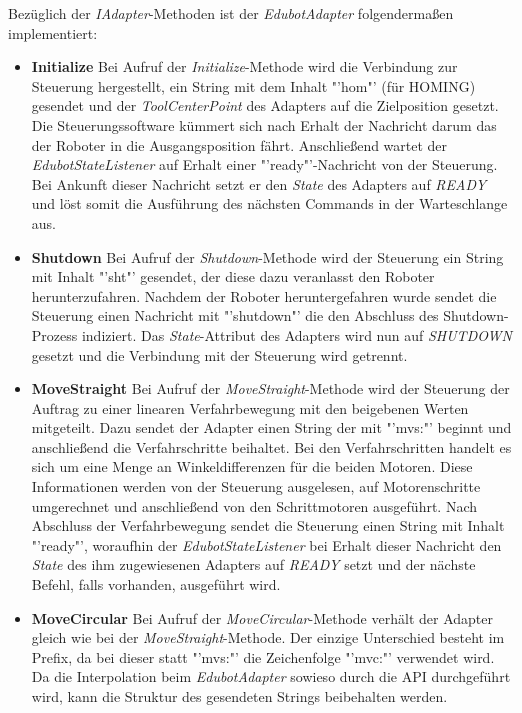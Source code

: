 Bezüglich der \textit{IAdapter}-Methoden ist der \textit{EdubotAdapter} folgendermaßen implementiert:
\begin{itemize}
\item \textbf{Initialize}
\newline
Bei Aufruf der \textit{Initialize}-Methode wird die Verbindung zur Steuerung hergestellt, ein String mit dem Inhalt "'hom"' (für HOMING) gesendet und der \textit{ToolCenterPoint} des Adapters auf die Zielposition gesetzt. Die Steuerungssoftware kümmert sich nach Erhalt der Nachricht darum das der Roboter in die Ausgangsposition fährt. Anschließend wartet der \textit{EdubotStateListener} auf Erhalt einer "'ready"'-Nachricht von der Steuerung. Bei Ankunft dieser Nachricht setzt er den \textit{State} des Adapters auf \textit{READY} und löst somit die Ausführung des nächsten Commands in der Warteschlange aus.
\item \textbf{Shutdown}
\newline
Bei Aufruf der \textit{Shutdown}-Methode wird der Steuerung ein String mit Inhalt "'sht"' gesendet, der diese dazu veranlasst den Roboter herunterzufahren. Nachdem der Roboter heruntergefahren wurde sendet die Steuerung einen Nachricht mit "'shutdown"' die den Abschluss des Shutdown-Prozess indiziert. Das \textit{State}-Attribut des Adapters wird nun auf \textit{SHUTDOWN} gesetzt und die Verbindung mit der Steuerung wird getrennt.
\item \textbf{MoveStraight}
\newline
Bei Aufruf der \textit{MoveStraight}-Methode wird der Steuerung der Auftrag zu einer linearen Verfahrbewegung mit den beigebenen Werten mitgeteilt. Dazu sendet der Adapter einen String der mit "'mvs:"' beginnt und anschließend die Verfahrschritte beihaltet. Bei den Verfahrschritten handelt es sich um eine Menge an Winkeldifferenzen für die beiden Motoren. Diese Informationen werden von der Steuerung ausgelesen, auf Motorenschritte umgerechnet und anschließend von den Schrittmotoren ausgeführt. Nach Abschluss der Verfahrbewegung sendet die Steuerung einen String mit Inhalt "'ready"', woraufhin der \textit{EdubotStateListener} bei Erhalt dieser Nachricht den \textit{State} des ihm zugewiesenen Adapters auf \textit{READY} setzt und der nächste Befehl, falls vorhanden, ausgeführt wird.
\item \textbf{MoveCircular}
\newline
Bei Aufruf der \textit{MoveCircular}-Methode verhält der Adapter gleich wie bei der \textit{MoveStraight}-Methode. Der einzige Unterschied besteht im Prefix, da bei dieser statt "'mvs:"' die Zeichenfolge "'mvc:"' verwendet wird. Da die Interpolation beim \textit{EdubotAdapter} sowieso durch die API durchgeführt wird, kann die Struktur des gesendeten Strings beibehalten werden.

\end{itemize}
